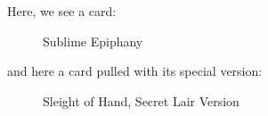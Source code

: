 \documentclass[a4paper]{scrartcl}
\begin{document}
	Here, we see a card:
	\begin{figure}[h]
		\caption{Sublime Epiphany}
	\end{figure}
	and here a card pulled with its special version:
	\begin{figure}[h]
		\caption{Sleight of Hand, Secret Lair Version}
	\end{figure}
\end{document}
